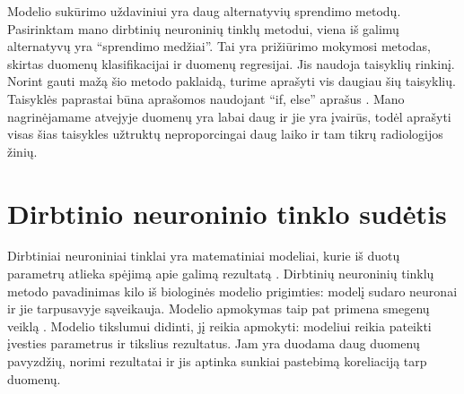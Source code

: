 \documentclass{VUMIFInfKursinis}
\begin{document}
\par
Modelio sukūrimo uždaviniui yra daug alternatyvių sprendimo metodų.
Pasirinktam mano dirbtinių neuroninių tinklų metodui, viena iš galimų alternatyvų yra \enquote{sprendimo medžiai}.
Tai yra prižiūrimo mokymosi metodas, skirtas duomenų klasifikacijai ir duomenų regresijai. Jis
naudoja taisyklių rinkinį. Norint gauti mažą šio metodo paklaidą, turime aprašyti vis daugiau šių taisyklių.
Taisyklės paprastai būna aprašomos naudojant \enquote{if, else} aprašus \cite{salt1}. Mano nagrinėjamame atvejyje duomenų yra labai daug ir jie yra įvairūs, todėl aprašyti visas šias taisykles užtruktų neproporcingai daug laiko ir tam
tikrų radiologijos žinių.


\tableofcontents

\section{Dirbtinio neuroninio tinklo sudėtis}
Dirbtiniai neuroniniai tinklai yra matematiniai modeliai,
kurie iš duotų parametrų atlieka spėjimą apie galimą rezultatą \cite{salt24}.
Dirbtinių neuroninių tinklų metodo pavadinimas
kilo iš biologinės modelio prigimties: modelį sudaro neuronai
ir jie tarpusavyje sąveikauja. Modelio apmokymas taip pat primena 
smegenų veiklą \cite{salt24}. Modelio tikslumui didinti, jį reikia apmokyti: modeliui reikia pateikti įvesties parametrus
ir tikslius rezultatus. Jam yra duodama daug duomenų pavyzdžių, norimi rezultatai ir jis aptinka
sunkiai pastebimą koreliaciją tarp duomenų.
\end{document}
